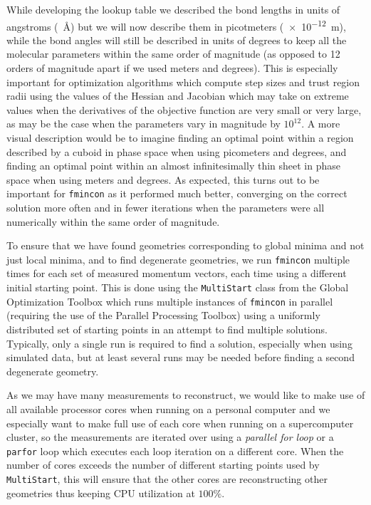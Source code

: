 While developing the lookup table we described the bond lengths in units of angstroms (\SI{}{\angstrom}) but we will now describe them in picotmeters (\SI{e-12}{\m}), while the bond angles will still be described in units of degrees to keep all the molecular parameters within the same order of magnitude (as opposed to 12 orders of magnitude apart if we used meters and degrees). This is especially important for optimization algorithms which compute step sizes and trust region radii using the values of the Hessian and Jacobian which may take on extreme values when the derivatives of the objective function are very small or very large, as may be the case when the parameters vary in magnitude by $10^{12}$. A more visual description would be to imagine finding an optimal point within a region described by a cuboid in phase space when using picometers and degrees, and finding an optimal point within an almost infinitesimally thin sheet in phase space when using meters and degrees. As expected, this turns out to be important for \texttt{fmincon} as it performed much better, converging on the correct solution more often and in fewer iterations when the parameters were all numerically within the same order of magnitude.

To ensure that we have found geometries corresponding to global minima and not just local minima, and to find degenerate geometries, we run \texttt{fmincon} multiple times for each set of measured momentum vectors, each time using a different initial starting point. This is done using the \texttt{MultiStart} class from the Global Optimization Toolbox which runs multiple instances of \texttt{fmincon} in parallel (requiring the use of the Parallel Processing Toolbox) using a uniformly distributed set of starting points in an attempt to find multiple solutions. Typically, only a single run is required to find a solution, especially when using simulated data, but at least several runs may be needed before finding a second degenerate geometry.

As we may have many measurements to reconstruct, we would like to make use of all available processor cores when running on a personal computer and we especially want to make full use of each core when running on a supercomputer cluster, so the measurements are iterated over using a \emph{parallel for loop} or a \texttt{parfor} loop which executes each loop iteration on a different core. When the number of cores exceeds the number of different starting points used by \texttt{MultiStart}, this will ensure that the other cores are reconstructing other geometries thus keeping CPU utilization at $100\%$.

